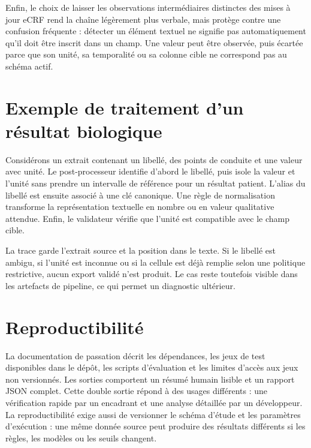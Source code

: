 Enfin, le choix de laisser les observations intermédiaires distinctes des mises à jour eCRF rend la chaîne légèrement plus verbale, mais protège contre une confusion fréquente : détecter un élément textuel ne signifie pas automatiquement qu'il doit être inscrit dans un champ. Une valeur peut être observée, puis écartée parce que son unité, sa temporalité ou sa colonne cible ne correspond pas au schéma actif.

\section{Exemple de traitement d'un résultat biologique}
Considérons un extrait contenant un libellé, des points de conduite et une valeur avec unité. Le post-processeur identifie d'abord le libellé, puis isole la valeur et l'unité sans prendre un intervalle de référence pour un résultat patient. L'alias du libellé est ensuite associé à une clé canonique. Une règle de normalisation transforme la représentation textuelle en nombre ou en valeur qualitative attendue. Enfin, le validateur vérifie que l'unité est compatible avec le champ cible.

La trace garde l'extrait source et la position dans le texte. Si le libellé est ambigu, si l'unité est inconnue ou si la cellule est déjà remplie selon une politique restrictive, aucun export validé n'est produit. Le cas reste toutefois visible dans les artefacts de pipeline, ce qui permet un diagnostic ultérieur.

\section{Reproductibilité}
La documentation de passation décrit les dépendances, les jeux de test disponibles dans le dépôt, les scripts d'évaluation et les limites d'accès aux jeux non versionnés. Les sorties comportent un résumé humain lisible et un rapport JSON complet. Cette double sortie répond à des usages différents : une vérification rapide par un encadrant et une analyse détaillée par un développeur. La reproductibilité exige aussi de versionner le schéma d'étude et les paramètres d'exécution : une même donnée source peut produire des résultats différents si les règles, les modèles ou les seuils changent.
